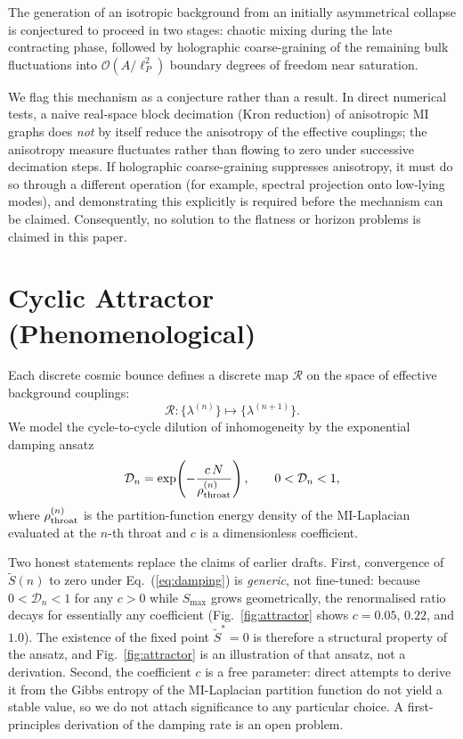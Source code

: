 \documentclass[reprint,superscriptaddress,amsmath,amssymb,aps,prd,showkeys,nofootinbib]{revtex4-2}
\begin{document}
The generation of an isotropic background from an initially asymmetrical collapse is
conjectured to proceed in two stages: chaotic mixing during the late contracting phase,
followed by holographic coarse-graining of the remaining bulk fluctuations into
$\mathcal{O}(A/\ell_P^2)$ boundary degrees of freedom near saturation.

We flag this mechanism as a conjecture rather than a result. In direct numerical tests, a
naive real-space block decimation (Kron reduction) of anisotropic MI graphs does \emph{not}
by itself reduce the anisotropy of the effective couplings; the anisotropy measure
fluctuates rather than flowing to zero under successive decimation steps. If holographic
coarse-graining suppresses anisotropy, it must do so through a different operation (for
example, spectral projection onto low-lying modes), and demonstrating this explicitly is
required before the mechanism can be claimed. Consequently, no solution to the flatness or
horizon problems is claimed in this paper.

\section{Cyclic Attractor (Phenomenological)}
\label{sec:attractor}

Each discrete cosmic bounce defines a discrete map $\mathcal{R}$ on the space of effective
background couplings:
\begin{equation}
\mathcal{R}:\{\lambda^{(n)}\}\mapsto\{\lambda^{(n+1)}\}.
\end{equation}
We model the cycle-to-cycle dilution of inhomogeneity by the exponential damping ansatz
\begin{equation}
\mathcal{D}_n = \exp\!\left(-\frac{c\,N}{\rho_{\rm throat}^{(n)}}\right),
\qquad 0<\mathcal{D}_n<1,
\label{eq:damping}
\end{equation}
where $\rho_{\rm throat}^{(n)}$ is the partition-function energy density of the
MI-Laplacian evaluated at the $n$-th throat and $c$ is a dimensionless coefficient.

Two honest statements replace the claims of earlier drafts. First, convergence of
$\tilde{S}(n)$ to zero under Eq.~(\ref{eq:damping}) is \emph{generic}, not fine-tuned:
because $0<\mathcal{D}_n<1$ for any $c>0$ while $S_{\max}$ grows geometrically, the
renormalised ratio decays for essentially any coefficient (Fig.~\ref{fig:attractor} shows
$c=0.05$, $0.22$, and $1.0$). The existence of the fixed point $\tilde{S}^*=0$ is therefore
a structural property of the ansatz, and Fig.~\ref{fig:attractor} is an illustration of
that ansatz, not a derivation. Second, the coefficient $c$ is a free parameter: direct
attempts to derive it from the Gibbs entropy of the MI-Laplacian partition function do not
yield a stable value, so we do not attach significance to any particular choice. A
first-principles derivation of the damping rate is an open problem.
\end{document}
